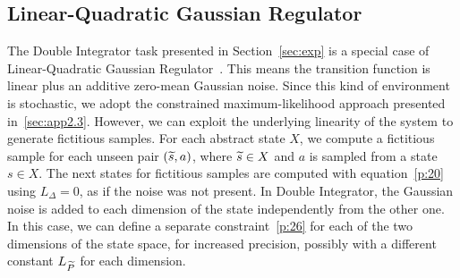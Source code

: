 \subsection{Linear-Quadratic Gaussian Regulator}\label{sec:app2.4}
The Double Integrator task presented in Section~\ref{sec:exp} is a special case of Linear-Quadratic Gaussian Regulator~\citep[LQG,][see Section~\ref{sec:di} for further details]{peters2002policy}. This means the transition function is linear plus an additive zero-mean Gaussian noise.
Since this kind of environment is stochastic, we adopt the constrained maximum-likelihood approach presented in~\ref{sec:app2.3}. 
However, we can exploit the underlying linearity of the system to generate fictitious samples.
For each abstract state $X$, we compute a fictitious sample for each unseen pair $(\widetilde{s}, a)$, where $\widetilde{s} \in X$ and $a$ is sampled from a state $s \in X$. The next states for fictitious samples are computed with equation~\eqref{p:20} using $L_{\Delta}=0$, as if the noise was not present. 
In Double Integrator, the Gaussian noise is added to each dimension of the state independently from the other one. 
In this case, we can define a separate constraint~\eqref{p:26} for each of the two dimensions of the state space, for increased precision, possibly with a different constant $L_{\widetilde{P}}$ for each dimension.